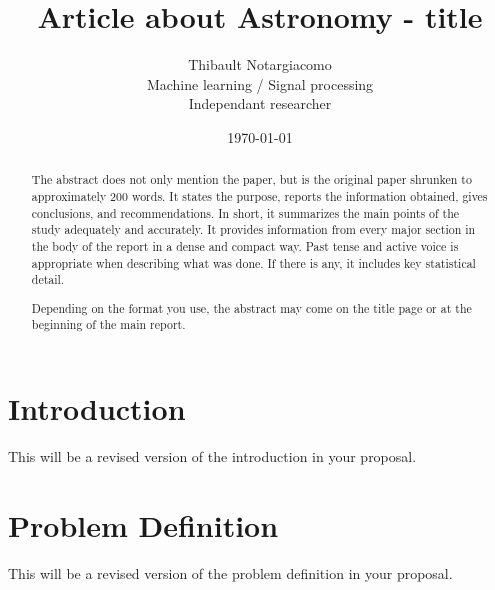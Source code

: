 \documentclass[peerreview]{IEEEtran} %
\begin{document}
\title{Article about Astronomy - title}



\author{Thibault Notargiacomo \\
Machine learning / Signal processing\\
Independant researcher\\
}
\date{\today}

\maketitle
\tableofcontents
\listoffigures
\listoftables

\IEEEpeerreviewmaketitle
\begin{abstract}
The abstract does not only mention the paper, but is the original paper shrunken to approximately 200 words. It states the purpose, reports the information obtained, gives conclusions, and recommendations. In short, it summarizes the main points of the study adequately and accurately. It provides information from every major section in the body of the report in a dense and compact way. Past tense and active voice is appropriate when describing what was done. If there is any, it includes key statistical detail.  

Depending on the format you use, the abstract may come on the title page or at the beginning of the main report.

\end{abstract}





\section{Introduction}
This will be a revised version of the introduction in your proposal.

\section{Problem Definition}
This will be a revised version of the problem definition in your proposal.
\end{document}

